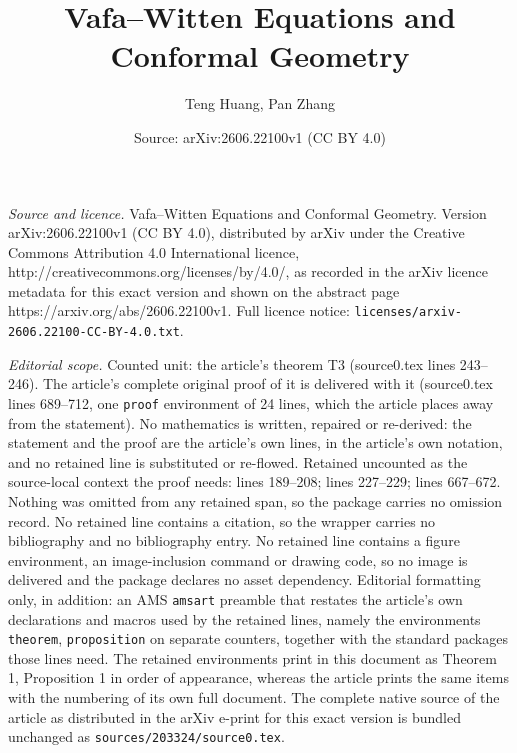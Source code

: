 \documentclass[10pt,a4paper]{amsart}
\title{Vafa--Witten Equations and Conformal Geometry}
\author{Teng Huang, Pan Zhang}
\date{Source: arXiv:2606.22100v1 (CC BY 4.0)}
\begin{document}
\maketitle

\noindent\emph{Source and licence.} Vafa--Witten Equations and Conformal Geometry. Version arXiv:2606.22100v1 (CC BY 4.0), distributed by arXiv under the Creative Commons Attribution 4.0 International licence, http://creativecommons.org/licenses/by/4.0/, as recorded in the arXiv licence metadata for this exact version and shown on the abstract page https://arxiv.org/abs/2606.22100v1. Full licence notice: \texttt{licenses/arxiv-2606.22100-CC-BY-4.0.txt}.\par\smallskip

\noindent\textit{Editorial scope.} Counted unit: the article's theorem T3 (source0.tex lines 243--246). The article's complete original proof of it is delivered with it (source0.tex lines 689--712, one \texttt{proof} environment of 24 lines, which the article places away from the statement). No mathematics is written, repaired or re-derived: the statement and the proof are the article's own lines, in the article's own notation, and no retained line is substituted or re-flowed.  Retained uncounted as the source-local context the proof needs: lines 189--208; lines 227--229; lines 667--672.  Nothing was omitted from any retained span, so the package carries no omission record.  No retained line contains a citation, so the wrapper carries no bibliography and no bibliography entry.  No retained line contains a figure environment, an image-inclusion command or drawing code, so no image is delivered and the package declares no asset dependency.  Editorial formatting only, in addition: an AMS \texttt{amsart} preamble that restates the article's own declarations and macros used by the retained lines, namely the environments \texttt{theorem}, \texttt{proposition} on separate counters, together with the standard packages those lines need.  The retained environments print in this document as Theorem 1, Proposition 1 in order of appearance, whereas the article prints the same items with the numbering of its own full document.  The complete native source of the article as distributed in the arXiv e-print for this exact version is bundled unchanged as \texttt{sources/203324/source0.tex}.
\end{document}
